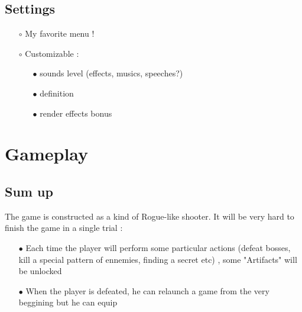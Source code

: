 \documentclass[12pt,a4paper]{article}
\begin{document}
    \subsection{Settings}
        \begin{itemize}
            \item[$\circ$] My favorite menu !
            \item[$\circ$] Customizable :
            \begin{itemize}
                \item[$\bullet$] sounds level (effects, musics, speeches?)
                \item[$\bullet$] definition
                \item[$\bullet$] render effects bonus
            \end{itemize}
        \end{itemize}

\section{Gameplay}
    \subsection{Sum up}
        The game is constructed as a kind of Rogue-like shooter. It will be very hard to finish the game in a single trial :
            \begin{itemize}
                \item[$\bullet$] Each time the player will perform some particular actions (defeat bosses, kill a special pattern of ennemies, finding a secret etc) , some "Artifacts" will be unlocked
                \item[$\bullet$] When the player is defeated, he can relaunch a game from the very beggining but he can equip

            \end{itemize}
        
\end{document}

